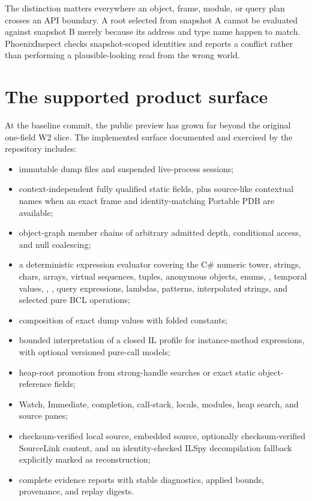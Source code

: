 \documentclass[11pt,oneside,openany]{book}
\newcommand{\typeName}[1]{\texttt{\detokenize{#1}}}
\newcommand{\codeinline}[1]{\texttt{\detokenize{#1}}}
\begin{document}
The distinction matters everywhere an object, frame, module, or query plan crosses an API boundary. A root selected from snapshot A cannot be evaluated against snapshot B merely because its address and type name happen to match. PhoenixInspect checks snapshot-scoped identities and reports a conflict rather than performing a plausible-looking read from the wrong world.

\section{The supported product surface}

At the baseline commit, the public preview has grown far beyond the original one-field W2 slice. The implemented surface documented and exercised by the repository includes:

\begin{itemize}
  \item immutable dump files and suspended live-process sessions;
  \item context-independent fully qualified static fields, plus source-like contextual names when an exact frame and identity-matching Portable PDB are available;
  \item object-graph member chains of arbitrary admitted depth, conditional access, and null coalescing;
  \item a deterministic expression evaluator covering the C\# numeric tower, strings, chars, arrays, virtual sequences, tuples, anonymous objects, enums, \codeinline{typeof}, temporal values, \typeName{Guid}, \typeName{Version}, query expressions, lambdas, patterns, interpolated strings, and selected pure BCL operations;
  \item composition of exact dump values with folded constants;
  \item bounded interpretation of a closed IL profile for instance-method expressions, with optional versioned pure-call models;
  \item heap-root promotion from strong-handle searches or exact static object-reference fields;
  \item Watch, Immediate, completion, call-stack, locals, modules, heap search, and source panes;
  \item checksum-verified local source, embedded source, optionally checksum-verified SourceLink content, and an identity-checked ILSpy decompilation fallback explicitly marked as reconstruction;
  \item complete evidence reports with stable diagnostics, applied bounds, provenance, and replay digests.
\end{itemize}
\end{document}
